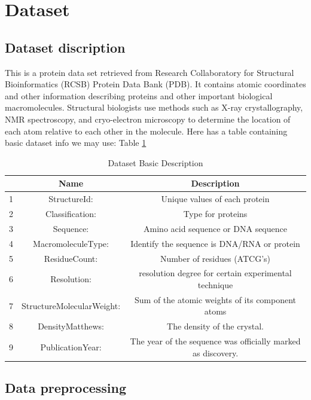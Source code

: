 \documentclass[sigconf]{acmart}
\begin{document}
\section{Dataset}
\subsection{Dataset discription}
This is a protein data set retrieved from Research Collaboratory for Structural Bioinformatics (RCSB) Protein Data Bank (PDB). It contains atomic coordinates and other information describing proteins and other important biological macromolecules. Structural biologists use methods such as X-ray crystallography, NMR spectroscopy, and cryo-electron microscopy to determine the location of each atom relative to each other in the molecule. Here has a table containing basic dataset info we may use: Table   \ref{tab:dataset}

\begin{table}
  \centering
  \caption{Dataset Basic Description}
  \label{tab:dataset}
  \begin{tabular}{c|c|c}
    \toprule
    & Name & Description \\
    \midrule
    1 & StructureId: & Unique values of each protein\\
    2 & Classification: & Type for proteins\\
    3 & Sequence: & Amino acid sequence or DNA sequence\\
    4 & MacromoleculeType: & Identify the sequence is DNA/RNA or protein\\
    5 & ResidueCount: & Number of residues (ATCG's)\\
    6 & Resolution: & resolution degree for certain experimental technique \\
    7 & StructureMolecularWeight: & Sum of the atomic weights of its component atoms\\
    8 & DensityMatthews: & The density of the crystal.\\
    9 & PublicationYear: & The year of the sequence was officially marked as discovery.\\
  \bottomrule
\end{tabular}
\end{table}

\subsection{Data preprocessing}
\end{document}
